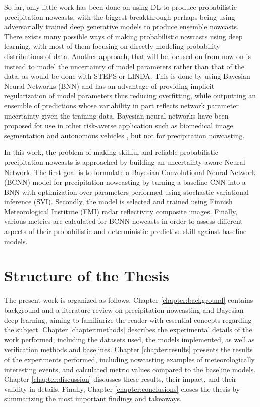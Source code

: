 So far, only little work has been done on using DL to produce probabilistic precipitation nowcasts, with the biggest breakthrough perhaps being \citet{ravuri_skilful_2021} using adversarially trained deep generative models to produce ensemble nowcasts. There exists many possible ways of making probabilistic nowcasts using deep learning, with most of them focusing on directly modeling probability distributions of data. Another approach, that will be focused on from now on is instead to model the uncertainty of model parameters rather than that of the data, as would be done with STEPS or LINDA. This is done by using Bayesian Neural Networks (BNN) and has an advantage of providing implicit regularization of model parameters thus reducing overfitting, while outputting an ensemble of predictions whose variability in part reflects network parameter uncertainty given the training data. Bayesian neural networks have been proposed for use in other risk-averse application such as biomedical image segmentation \cite{kwon_uncertainty_2020} and autonomous vehicles \cite{mcallister_concrete_2017}, but not for precipitation nowcasting. 

In this work, the problem of making skillful and reliable probabilistic precipitation nowcasts is approached by building an uncertainty-aware Neural Network. The first goal is to formulate a Bayesian Convolutional Neural Network (BCNN) model for precipitation nowcasting by turning a baseline CNN into a BNN with optimization over parameters performed using stochastic variational inference (SVI). Secondly, the model is selected and trained using Finnish Meteorological Institute (FMI) radar reflectivity composite images. Finally, various metrics are calculated for BCNN nowcasts in order to assess different aspects of their probabilistic and deterministic predictive skill against baseline models.


\section{Structure of the Thesis}

The present work is organized as follows. Chapter \ref{chapter:background} contains background and a literature review on precipitation nowcasting and Bayesian deep learning, aiming to familiarize the reader with essential concepts regarding the subject. Chapter \ref{chapter:methods} describes the experimental details of the work performed, including the datasets used, the models implemented, as well as verification methods and baselines. 
Chapter \ref{chapter:results} presents the results of the experiments performed, including nowcasting examples of meteorologically interesting events, and calculated metric values compared to the baseline models. Chapter \ref{chapter:discussion} discusses these results, their impact, and their validity in details. Finally, Chapter \ref{chapter:conclusions} closes the thesis by summarizing the most important findings and takeaways. 


